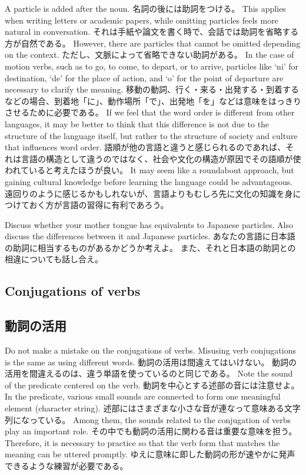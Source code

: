 \documentclass[uplatex,dvipdfmx,b5paper,english,10pt]{jsbook}
\begin{document}
\ifEnglish
A particle is added after the noun.
\else
名詞の後には助詞をつける。
\fi
\ifEnglish
This applies when writing letters or academic papers, while omitting particles feels more natural in conversation.
\else
それは手紙や論文を書く時で、会話では助詞を省略する方が自然である。
\fi
\ifEnglish
However, there are particles that cannot be omitted depending on the context.
\else
ただし、文脈によって省略できない助詞がある。
\fi
\ifEnglish
In the case of motion verbs, such as to go, to come, to depart, or to arrive, particles like `ni' for destination, `de' for the place of action, and `o' for the point of departure are necessary to clarify the meaning.
\else
移動の動詞、行く・来る・出発する・到着するなどの場合、到着地「に」、動作場所「で」、出発地「を」などは意味をはっきりさせるために必要である。
\fi
\ifEnglish
If we feel that the word order is different from other languages, it may be better to think that this difference is not due to the structure of the language itself, but rather to the structure of society and culture that influences word order.
\else
語順が他の言語と違うと感じられるのであれば、それは言語の構造として違うのではなく、社会や文化の構造が原因でその語順が使われていると考えたほうが良い。
\fi
\ifEnglish
It may seem like a roundabout approach, but gaining cultural knowledge before learning the language could be advantageous.
\else
遠回りのように感じるかもしれないが、言語よりもむしろ先に文化の知識を身につけておく方が言語の習得に有利であろう。
\fi

\begin{toiquestion}
\ifEnglish
Discuss whether your mother tongue has equivalents to Japanese particles.
Also discuss the differences between it and Japanese particles.
\else
あなたの言語に日本語の助詞に相当するものがあるかどうか考えよ。
また、それと日本語の助詞との相違についても話し合え。
\fi
\end{toiquestion}


\ifEnglish
\subsection{Conjugations of verbs}
\else
\subsection{動詞の活用}
\fi
\ifEnglish
Do not make a mistake on the conjugations of verbs.
Misusing verb conjugations is the same as using different words.
\else
動詞の活用は間違えてはいけない。
動詞の活用を間違えるのは、違う単語を使っているのと同じである。
\fi
\ifEnglish
Note the sound of the predicate centered on the verb.
\else
動詞を中心とする述部の音には注意せよ。
\fi
\ifEnglish
In the predicate, various small sounds are connected to form one meaningful element (character string).
\else
述部にはさまざまな小さな音が連なって意味ある文字列になっている。
\fi
\ifEnglish
Among them, the sounds related to the conjugation of verbs play an important role.
\else
その中でも動詞の活用に関わる音は重要な意味を担う。
\fi
\ifEnglish
Therefore, it is necessary to practice so that the verb form that matches the meaning can be uttered promptly.
\else
ゆえに意味に即した動詞の形が速やかに発声できるような練習が必要である。
\fi
\end{document}
